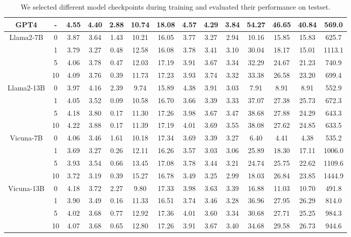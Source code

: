\begin{table}[h]
{\begin{tabular}{l|c|ccc|ccccc|ccc|c}
\multicolumn{1}{c|}{GPT4} & \textbf{-} & 4.55 & 4.40 & 2.88 & 10.74 & 18.08 & 4.57 & 4.29 & 3.84 & 54.27 & 46.65 & 40.84 & 569.0 \\ \hline
\multicolumn{1}{c|}{Llama2-7B} & 0 & 3.87 & 3.64 & 1.43 & 10.21 & 16.05 & 3.77 & 3.27 & 2.94 & 10.16 & 15.85 & 15.83 & 625.7 \\
 & 1 & 3.79 & 3.27 & 0.48 & 12.58 & 16.08 & 3.78 & 3.41 & 3.10 & 30.04 & 18.17 & 15.01 & 1113.1 \\
 & 5 & 4.06 & 3.78 & 0.47 & 12.03 & 17.19 & 3.91 & 3.67 & 3.34 & 32.29 & 24.67 & 21.23 & 740.9 \\
 & 10 & 4.09 & 3.76 & 0.39 & 11.73 & 17.23 & 3.93 & 3.74 & 3.32 & 33.38 & 26.58 & 23.20 & 699.4 \\ \hline
\multicolumn{1}{c|}{Llama2-13B} & 0 & 3.97 & 4.16 & 2.39 & 9.74 & 15.89 & 4.38 & 3.91 & 3.03 & 7.91 & 8.91 & 8.91 & 552.9 \\
 & 1 & 4.05 & 3.52 & 0.09 & 10.58 & 16.70 & 3.66 & 3.39 & 3.33 & 37.07 & 27.38 & 25.73 & 672.3 \\
 & 5 & 4.18 & 3.80 & 0.17 & 11.30 & 17.26 & 3.98 & 3.67 & 3.47 & 38.68 & 27.88 & 24.29 & 643.3 \\
 & 10 & 4.22 & 3.88 & 0.17 & 11.39 & 17.19 & 4.01 & 3.69 & 3.55 & 38.08 & 27.62 & 24.85 & 633.5 \\ \hline
\multicolumn{1}{c|}{Vicuna-7B} & 0 & 4.06 & 3.46 & 1.61 & 10.18 & 17.34 & 3.69 & 3.39 & 3.27 & 6.40 & 4.41 & 4.38 & 535.2 \\
 & 1 & 3.69 & 3.27 & 0.26 & 12.11 & 16.26 & 3.57 & 3.03 & 3.06 & 25.89 & 18.30 & 17.11 & 1006.0 \\
 & 5 & 3.93 & 3.54 & 0.66 & 13.45 & 17.08 & 3.78 & 3.44 & 3.21 & 24.74 & 25.75 & 22.62 & 1109.6 \\
 & 10 & 3.72 & 3.19 & 0.39 & 15.27 & 16.78 & 3.49 & 3.25 & 2.99 & 18.03 & 26.84 & 23.85 & 1444.9 \\ \hline
\multicolumn{1}{c|}{Vicuna-13B} & 0 & 4.18 & 3.72 & 2.27 & 9.80 & 17.33 & 3.98 & 3.63 & 3.39 & 16.88 & 11.03 & 10.70 & 491.8 \\
 & 1 & 3.90 & 3.49 & 0.16 & 11.33 & 16.51 & 3.74 & 3.46 & 3.28 & 36.96 & 27.95 & 26.29 & 814.0 \\
 & 5 & 4.02 & 3.68 & 0.77 & 12.92 & 17.36 & 4.01 & 3.60 & 3.34 & 30.68 & 27.71 & 25.25 & 984.3 \\
 & 10 & 4.07 & 3.68 & 0.65 & 12.80 & 17.26 & 3.91 & 3.67 & 3.40 & 34.68 & 29.58 & 26.73 & 944.6 \\ \hline
\end{tabular}}
\caption{We selected different model checkpoints during training and evaluated their performance on testset.}
\end{table}
